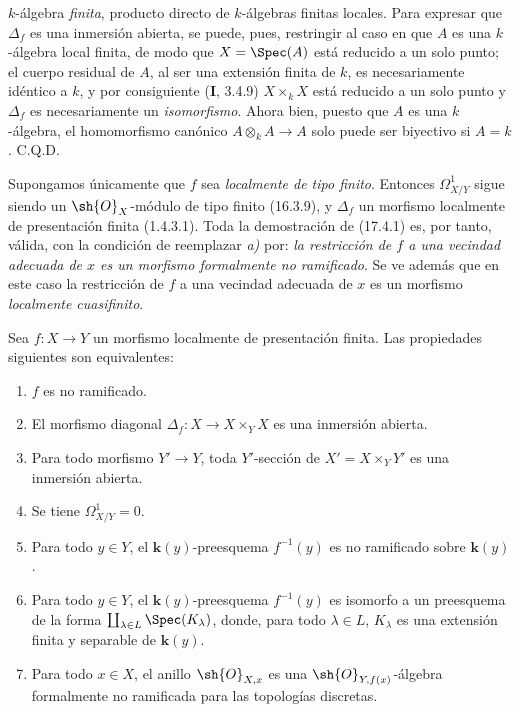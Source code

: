 $k$-álgebra \emph{finita}, producto directo de $k$-álgebras finitas locales. Para expresar que $\Delta_f$ es una inmersión abierta, se puede, pues, restringir al caso en que $A$ es una $k$-álgebra local finita, de modo que $X=\Spec(A)$ está reducido a un solo punto; el cuerpo residual de $A$, al ser una extensión finita de $k$, es necesariamente idéntico a $k$, y por consiguiente (\textbf I, 3.4.9) $X\times_k X$ está reducido a un solo punto y $\Delta_f$ es necesariamente un \emph{isomorfismo}. Ahora bien, puesto que $A$ es una $k$-álgebra, el homomorfismo canónico $A\otimes_k A\to A$ solo puede ser biyectivo si $A=k$. C.Q.D.

\begin{remark}[17.4.1.2]
\label{IV.17.4.1.2}
Supongamos únicamente que $f$ sea \emph{localmente de tipo finito}. Entonces $\varOmega^1_{X/Y}$ sigue siendo un $\sh{O}_X$-módulo de tipo finito (16.3.9), y $\Delta_f$ un morfismo localmente de presentación finita (1.4.3.1). Toda la demostración de (17.4.1) es, por tanto, válida, con la condición de reemplazar \emph{a)} por: \emph{la restricción de $f$ a una vecindad adecuada de $x$ es un morfismo formalmente no ramificado}. Se ve además que en este caso la restricción de $f$ a una vecindad adecuada de $x$ es un morfismo \emph{localmente cuasifinito}.
\end{remark}

\begin{corollary}[17.4.2]
\label{IV.17.4.2}
Sea $f:X\to Y$ un morfismo localmente de presentación finita. Las propiedades siguientes son equivalentes:
\begin{enumerate}
  \item[\textup{a)}] $f$ es no ramificado.
  \item[\textup{b)}] El morfismo diagonal $\Delta_f:X\to X\times_Y X$ es una inmersión abierta.
  \item[\textup{b$'$)}] Para todo morfismo $Y'\to Y$, toda $Y'$-sección de $X'=X\times_Y Y'$ es una inmersión abierta.
  \item[\textup{c)}] Se tiene $\varOmega^1_{X/Y}=0$.
  \item[\textup{d)}] Para todo $y\in Y$, el $\boldsymbol{k}(y)$-preesquema $f^{-1}(y)$ es no ramificado sobre $\boldsymbol{k}(y)$.
  \item[\textup{d$'$)}] Para todo $y\in Y$, el $\boldsymbol{k}(y)$-preesquema $f^{-1}(y)$ es isomorfo a un preesquema de la forma $\coprod_{\lambda\in L}\Spec(K_\lambda)$, donde, para todo $\lambda\in L$, $K_\lambda$ es una extensión finita y separable de $\boldsymbol{k}(y)$.
  \item[\textup{e)}] Para todo $x\in X$, el anillo $\sh{O}_{X,x}$ es una $\sh{O}_{Y,f(x)}$-álgebra formalmente no ramificada para las topologías discretas.
\end{enumerate}
\end{corollary}

